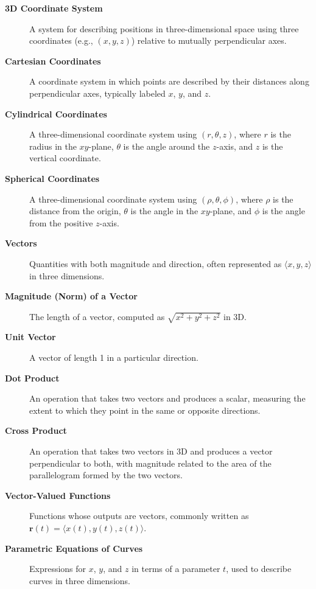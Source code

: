 \begin{description}

  \item[\textbf{3D Coordinate System}] A system for describing positions in three-dimensional space using three coordinates (e.g., $(x,y,z)$) relative to mutually perpendicular axes.

  \item[\textbf{Cartesian Coordinates}] A coordinate system in which points are described by their distances along perpendicular axes, typically labeled $x$, $y$, and $z$.

  \item[\textbf{Cylindrical Coordinates}] A three-dimensional coordinate system using $(r, \theta, z)$, where $r$ is the radius in the $xy$-plane, $\theta$ is the angle around the $z$-axis, and $z$ is the vertical coordinate.

  \item[\textbf{Spherical Coordinates}] A three-dimensional coordinate system using $(\rho, \theta, \phi)$, where $\rho$ is the distance from the origin, $\theta$ is the angle in the $xy$-plane, and $\phi$ is the angle from the positive $z$-axis.

  \item[\textbf{Vectors}] Quantities with both magnitude and direction, often represented as $\langle x, y, z \rangle$ in three dimensions.

  \item[\textbf{Magnitude (Norm) of a Vector}] The length of a vector, computed as $\sqrt{x^2 + y^2 + z^2}$ in 3D.

  \item[\textbf{Unit Vector}] A vector of length 1 in a particular direction.

  \item[\textbf{Dot Product}] An operation that takes two vectors and produces a scalar, measuring the extent to which they point in the same or opposite directions.

  \item[\textbf{Cross Product}] An operation that takes two vectors in 3D and produces a vector perpendicular to both, with magnitude related to the area of the parallelogram formed by the two vectors.

  \item[\textbf{Vector-Valued Functions}] Functions whose outputs are vectors, commonly written as $\mathbf{r}(t) = \langle x(t), y(t), z(t) \rangle$.

  \item[\textbf{Parametric Equations of Curves}] Expressions for $x$, $y$, and $z$ in terms of a parameter $t$, used to describe curves in three dimensions.


\end{description}
